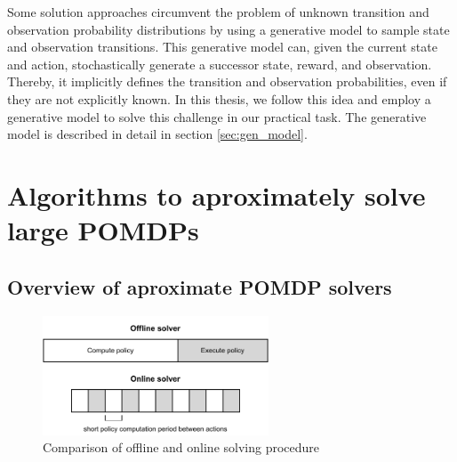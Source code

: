 Some solution approaches circumvent the problem of unknown transition and observation probability distributions by using a generative model to sample state and observation transitions. This generative model can, given the current state and action, stochastically generate a successor state, reward, and observation. Thereby, it implicitly defines the transition and observation probabilities, even if they are not explicitly known. In this thesis, we follow this idea and employ a generative model to solve this challenge in our practical task. The generative model is described in detail in section \ref{sec:gen_model}.


\section{Algorithms to aproximately solve large POMDPs}



\subsection{Overview of aproximate POMDP solvers}
\label{sec:solvers}

\begin{figure}[htbp]
    \centering
    \includegraphics[width=0.6\textwidth]{figures/online-offline.pdf}
    \caption{Comparison of offline and online solving procedure}
\end{figure}

